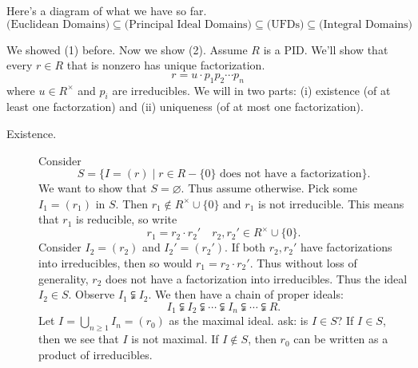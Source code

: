 Here's a diagram of what we have so far. 
\[
    \text{(Euclidean Domains)} \subseteq \text{(Principal Ideal Domains)} \subseteq \text{(UFDs)} \subseteq \text{(Integral Domains)}
\]
\begin{prf}
    We showed (1) before. Now we show (2). Assume $R$ is a PID.
    We'll show that every $r \in R$ that is nonzero has unique
    factorization. 
    \[
        r = u \cdot p_1p_2 \cdots p_n
    \]
    where $u \in R^{\times}$ and $p_i$ are irreducibles. We will
    in two parts: (i) existence (of at least one factorzation) and
    (ii) uniqueness (of at most one factorization).

    \begin{description}
        \item[Existence.] Consider
        \[
            S = \{I = (r) \mid r \in R-\{0\} \text{ does not have a factorization}\}.   
        \]  
        We want to show that $S = \varnothing$. Thus assume
        otherwise. Pick some $I_1 = (r_1)$ in $S$. 
        Then $r_1 \not\in R^{\times}\cup\{0\}$ and $r_1$ is not
        irreducible. This means that $r_1$ is reducible, so write 
        \[
            r_1 = r_2 \cdot r_2' \quad r_2,r_2' \in R^{\times}\cup\{0\}.
        \]
        Consider $I_2 = (r_2)$ and $I_2' = (r_2')$. If both $r_2,
        r_2'$ have factorizations into irreducibles, then so would
        $r_1 = r_2\cdot r_2'$. Thus without loss of generality, $r_2$
        does not have a factorization into irreducibles. Thus the
        ideal $I_2 \in S$. Observe $I_1 \subsetneqq I_2$. We then have
        a chain of proper ideals:
        \[
            I_1 \subsetneqq I_2 \subsetneqq \cdots \subsetneqq I_n \subsetneqq \cdots \subsetneqq R.
        \]
        Let $\displaystyle I = \bigcup_{n \ge 1} I_n = (r_0)$ as the maximal ideal.
        ask: is $I \in S$? If  $I \in S$, then we see that $I$ is not
        maximal. If $I \not\in S$, then $r_0$ can be written as a
        product of irreducibles. 


\end{description}
\end{prf}
